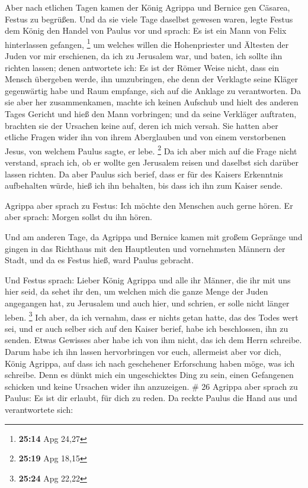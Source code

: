  Aber nach etlichen Tagen kamen der König Agrippa und
Bernice gen Cäsarea, Festus zu begrüßen.  Und da sie viele
Tage daselbst gewesen waren, legte Festus dem König den Handel von
Paulus vor und sprach: Es ist ein Mann von Felix hinterlassen gefangen,
\footnote{\textbf{25:14} Apg 24,27}  um welches willen die
Hohenpriester und Ältesten der Juden vor mir erschienen, da ich zu
Jerusalem war, und baten, ich sollte ihn richten lassen; 
denen antwortete ich: Es ist der Römer Weise nicht, dass ein Mensch
übergeben werde, ihn umzubringen, ehe denn der Verklagte seine Kläger
gegenwärtig habe und Raum empfange, sich auf die Anklage zu
verantworten.  Da sie aber her zusammenkamen, machte ich
keinen Aufschub und hielt des anderen Tages Gericht und hieß den Mann
vorbringen;  und da seine Verkläger auftraten, brachten sie
der Ursachen keine auf, deren ich mich versah.  Sie hatten
aber etliche Fragen wider ihn von ihrem Aberglauben und von einem
verstorbenen Jesus, von welchem Paulus sagte, er lebe. \footnote{\textbf{25:19}
  Apg 18,15}  Da ich aber mich auf die Frage nicht
verstand, sprach ich, ob er wollte gen Jerusalem reisen und daselbst
sich darüber lassen richten.  Da aber Paulus sich berief,
dass er für des Kaisers Erkenntnis aufbehalten würde, hieß ich ihn
behalten, bis dass ich ihn zum Kaiser sende.

 Agrippa aber sprach zu Festus: Ich möchte den Menschen
auch gerne hören. Er aber sprach: Morgen sollst du ihn hören.

 Und am anderen Tage, da Agrippa und Bernice kamen mit
großem Gepränge und gingen in das Richthaus mit den Hauptleuten und
vornehmsten Männern der Stadt, und da es Festus hieß, ward Paulus
gebracht.

 Und Festus sprach: Lieber König Agrippa und alle ihr
Männer, die ihr mit uns hier seid, da sehet ihr den, um welchen mich die
ganze Menge der Juden angegangen hat, zu Jerusalem und auch hier, und
schrien, er solle nicht länger leben. \footnote{\textbf{25:24} Apg 22,22}
 Ich aber, da ich vernahm, dass er nichts getan hatte, das
des Todes wert sei, und er auch selber sich auf den Kaiser berief, habe
ich beschlossen, ihn zu senden.  Etwas Gewisses aber habe
ich von ihm nicht, das ich dem Herrn schreibe. Darum habe ich ihn lassen
hervorbringen vor euch, allermeist aber vor dich, König Agrippa, auf
dass ich nach geschehener Erforschung haben möge, was ich schreibe.
 Denn es dünkt mich ein ungeschicktes Ding zu sein, einen
Gefangenen schicken und keine Ursachen wider ihn anzuzeigen. \# 26
 Agrippa aber sprach zu Paulus: Es ist dir erlaubt, für dich
zu reden. Da reckte Paulus die Hand aus und verantwortete sich:

